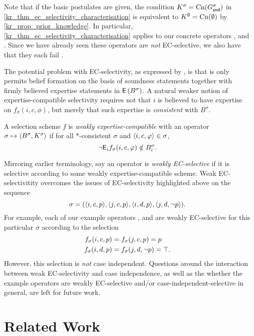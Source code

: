 Note that if the basic postulates are given, the condition $K^\sigma =
\operatorname{Cn}(G^\sigma_{\mathsf{snd}})$ in \cref{kr_thm_ec_selectivity_characterisation} is
equivalent to $K^\emptyset = \operatorname{Cn}(\emptyset)$ by \cref{kr_prop_prior_knowledge}.
In particular, \cref{kr_thm_ec_selectivity_characterisation} applies to our
concrete operators \varbasedcond{}, \partbasedcond{} and \scorebasedop{}. Since
we have already seen these operators are \emph{not} EC-selective, we also have
that they each fail \determination{}.

The potential problem with EC-selectivity, as expressed by \determination{}, is
that is only permits belief formation on the basis of soundness statements
together with firmly believed expertise statements in $\operatorname{\mathsf{E}}\left({B^\sigma}\right)$. A
natural weaker notion of expertise-compatible selectivity requires not that $i$
is believed to have expertise on $f_\sigma(i, c, \phi)$, but merely that such
expertise is \emph{consistent} with $B^\sigma$.

\begin{definition}
    A selection scheme $f$ is \emph{weakly expertise-compatible} with an
    operator $\sigma \mapsto \langle {B^\sigma, K^\sigma} \rangle$ if for all
    $\ast$-consistent $\sigma$ and $\langle {i, c, \varphi} \rangle \in \sigma$,
    \[
        \neg\mathsf{E}_i{f_\sigma(i, c, \varphi)} \notin B^\sigma_c.
    \]
\end{definition}

Mirroring earlier terminology, say an operator is \emph{weakly EC-selective} if
it is selective according to some weakly expertise-compatible scheme. Weak
EC-selectivitity overcomes the issues of EC-selectivity highlighted above on
the sequence
\[
    \sigma = ( \langle {i, c, p} \rangle, \langle {j, c, p} \rangle, \langle {i, d, p} \rangle,
    \langle {j, d, \neg p} \rangle).
\]
For example, each of our example operators
\varbasedcond{}, \partbasedcond{} and \scorebasedop{} are weakly EC-selective
for this particular $\sigma$ according to the selection
\begin{align*}
    f_\sigma(i, c, p) &= f_\sigma(j, c, p) = p \\
    f_\sigma(i, d, p) &= f_\sigma(j, d, \neg{p}) = \top.
\end{align*}
However, this selection is \emph{not} case independent. Questions around the
interaction between weak EC-selectivity and case independence, as well as the
whether the example operators are weakly EC-selective and/or
case-independent-selective in general, are left for future work.

\section{Related Work}
\label{kr_sec_relatedwork}

